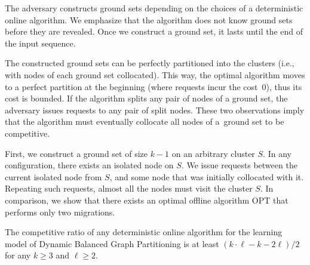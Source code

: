 \documentclass[a4paper,anonymous,USenglish]{lipics-v2019}
\newcommand{\OPT}{\textsc{OPT}\xspace}
\begin{document}
The adversary constructs ground sets depending on the choices of a deterministic online algorithm.
We emphasize that the algorithm does not know ground sets before they are revealed.
Once we construct a ground set, it lasts until the end of the input sequence.

The constructed ground sets can be perfectly partitioned into the clusters (i.e., with nodes of each ground set collocated).
This way, the optimal algorithm moves to a perfect partition at the beginning (where requests incur the cost~$0$), thus its cost is bounded.
If the algorithm splits any pair of nodes of a ground set, the adversary issues requests to any pair of split nodes.
These two observations imply that the algorithm must eventually collocate all nodes of a~ground set to be competitive.

First, we construct a ground set of size $k-1$ on an arbitrary cluster $S$.
In any configuration, there exists an isolated node on $S$.
We issue requests between the current isolated node from $S$, and some node that was initially collocated with it.
Repeating such requests, almost all the nodes must visit the cluster $S$.
In comparison, we show that there exists an optimal offline algorithm \OPT that performs only two migrations.

\begin{theorem}
	\label{th:lowerbound}
	The competitive ratio of any deterministic online algorithm for the learning model of Dynamic Balanced Graph Partitioning is at least $(k\cdot \ell - k - 2\ell)/2$ for any $k\geq 3$ and $\ell \geq 2$.
\end{theorem}
\end{document}

